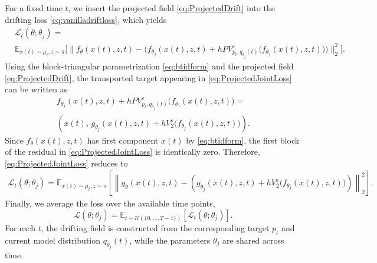 \documentclass[oneside,11pt]{article}
\theoremstyle{remark}
\begin{document}
For a fixed time $t$, we insert the projected field
    \eqref{eq:ProjectedDrift} into the drifting loss
    \eqref{eq:vanilladriftloss}, which yields
    \begin{align}
        &\mathcal{L}_t(\theta;\theta_j)
        = 
        \\ &\mathbb{E}_{x(t)\sim\mu_t,z\sim\pi}
        \Big[
        \big\|
            f_{\theta}(x(t),z,t)
            -
            \big(
                f_{\theta_j}(x(t),z,t)
                +
                hP V_{p_t,q_{\theta_j}(t)}^{\varepsilon}
                \big(
                    f_{\theta_j}(x(t),z,t)
                \big)
            \big)
        \big\|_2^2
        \Big]. \nonumber
        \label{eq:ProjectedJointLoss}
    \end{align}
Using the block-triangular parametrization
    \eqref{eq:btidform} and the projected field
    \eqref{eq:ProjectedDrift}, the transported target appearing in
    \eqref{eq:ProjectedJointLoss} can be written as
    \begin{multline}
        f_{\theta_j}(x(t),z,t)
        +
        hP V_{p_t,q_{\theta_j}(t)}^{\varepsilon}
        \big(
            f_{\theta_j}(x(t),z,t)
        \big)
        =\\
        \left(
            x(t),\,
            g_{\theta_j}(x(t),z,t)
            +
            hV_2^{\varepsilon}
            \big(
                f_{\theta_j}(x(t),z,t)
            \big)
        \right).
    \end{multline}
Since $f_{\theta}(x(t),z,t)$ has first component $x(t)$ by
    \eqref{eq:btidform}, the first block of the residual in
    \eqref{eq:ProjectedJointLoss} is identically zero. Therefore,
    \eqref{eq:ProjectedJointLoss} reduces to
    \begin{align}
        \mathcal{L}_t(\theta;\theta_j)
        =
        \mathbb{E}_{x(t)\sim\mu_t,z\sim\pi}
        \left[
        \left\|
            g_{\theta}(x(t),z,t)
            -
            \left(
                g_{\theta_j}(x(t),z,t)
                +
                hV_2^{\varepsilon}
                \big(
                    f_{\theta_j}(x(t),z,t)
                \big)
            \right)
        \right\|_2^2
        \right].
        \label{eq:ConditionalDriftLoss}
    \end{align}
Finally, we average the loss over the available time points,
\begin{equation}\label{eq:ProjectedLoss}
        \mathcal{L}(\theta;\theta_j)
        =
        \mathbb{E}_{t\sim\mathcal{U}(\{0,\ldots,T-1\})}
        \left[
\mathcal{L}_t(\theta;\theta_j)
        \right].
    \end{equation}
For each $t$, the drifting field is constructed from the
    corresponding target $p_t$ and current model distribution
    $q_{\theta_j}(t)$, while the parameters $\theta_j$ are shared across time.
\end{document}
